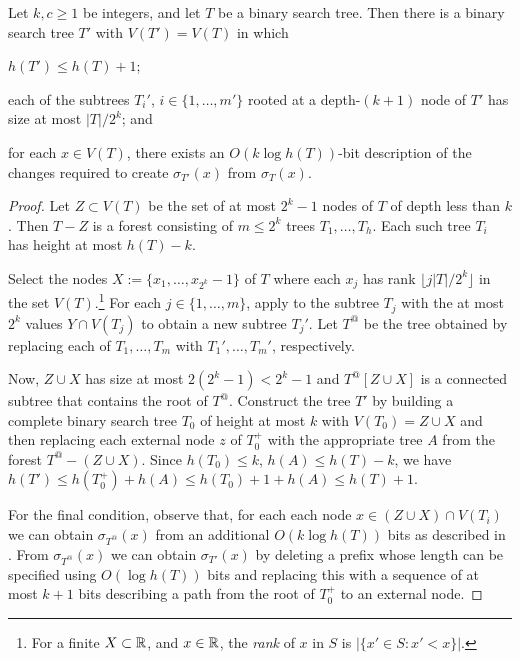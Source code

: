 \documentclass[kpfonts]{patmorin}
\newcommand{\snote}[1]{\fcolorbox{red}{yellow}{#1}}
\begin{document}
\begin{lem}
  Let $k,c\ge 1$ be integers, and let $T$ be a binary search tree.  Then there is a binary search tree $T'$ with $V(T')=V(T)$ in which
  \begin{compactenum}
    \item $h(T')\le h(T)+1$; 

    \item  each of the subtrees $T_i'$, $i\in\{1,\ldots,m'\}$ rooted at a depth-$(k+1)$ node of $T'$ has size at most $|T|/2^k$; and
    
    \item for each $x\in V(T)$, there exists an $O(k\log h(T))$-bit description of the changes required to create $\sigma_{T'}(x)$ from $\sigma_T(x)$.\snote{Use $B:(\{0,1\}^*)^2\to\{0,1\}^*$ terminology?}
  \end{compactenum}
\end{lem}

\begin{proof}
  Let $Z\subset V(T)$ be the set of at most $2^k-1$ nodes of $T$ of depth less than $k$.  Then $T-Z$ is a forest consisting of $m\le 2^{k}$ trees $T_1,\ldots,T_h$.  Each such tree $T_i$ has height at most $h(T)-k$.
  
  Select the nodes $X:=\{x_1,\ldots,x_{2^k}-1\}$ of $T$ where each $x_j$ has rank $\lfloor j|T|/2^k\rfloor$ in the set $V(T)$.\footnote{For a finite $X\subset\mathbb{R}$, and $x\in\mathbb{R}$, the \emph{rank} of $x$ in $S$ is $|\{x'\in S: x'<x\}|$.}  For each $j\in\{1,\ldots,m\}$, apply  to the subtree $T_j$ with the at most $2^k$ values $Y\cap V(T_j)$ to obtain a new subtree $T_{j}'$.  Let $T^@$ be the tree obtained by replacing each of $T_1,\ldots,T_m$ with $T_1',\ldots,T_m'$, respectively.
  
  Now, $Z\cup X$ has size at most $2(2^{k}-1)< 2^k-1$ and $T^@[Z\cup X]$ is a connected subtree that contains the root of $T^@$.  Construct the tree $T'$ by building a complete binary search tree $T_0$ of height at most $k$ with $V(T_0)=Z\cup X$ and then replacing each external node $z$ of $T_0^+$ with the appropriate tree $A$ from the forest $T^@-(Z\cup X)$.  Since $h(T_0)\le k$, $h(A)\le h(T)-k$, we have $h(T') \le h(T_0^+) + h(A) \le h(T_0)+1+ h(A) \le h(T)+1$.
  
  For the final condition, observe that, for each each node $x\in (Z\cup X)\cap V(T_i)$ we can obtain $\sigma_{T^@}(x)$ from an additional $O(k\log h(T))$ bits as described in . From $\sigma_{T^@}(x)$ we can obtain $\sigma_{T'}(x)$ by deleting a prefix whose length can be specified using $O(\log h(T))$ bits and replacing this with a sequence of at most $k+1$ bits describing a path from the root of $T^+_0$ to an external node.
\end{proof}
\end{document}
